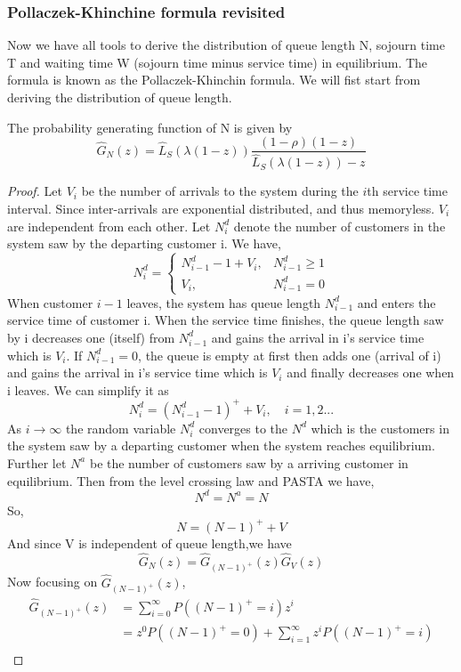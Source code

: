 \documentclass[project2.tex]{subfiles}
\begin{document}
\subsubsection{Pollaczek-Khinchine formula revisited}
Now we have all tools to derive the distribution of queue length N, sojourn time T and waiting time W (sojourn time minus service time) in equilibrium. The formula is known as the Pollaczek-Khinchin formula. We will fist start from deriving the distribution of queue length.
\begin{lemma}The probability generating function of N is given by 
$$\hat{G}_N(z)=\hat{L}_S(\lambda(1-z))\frac{(1-\rho)(1-z)}{\hat{L}_S(\lambda(1-z))-z}$$
\end{lemma}
\begin{proof}
Let $V_i$ be the number of arrivals to the system during the $i$th service time interval. Since inter-arrivals are exponential distributed, and thus memoryless. $V_i$ are independent from each other. Let $N_i^d$ denote the number of customers in the system saw by the departing customer i. We have,
\begin{equation*}
N_i^d=\left\{
\begin{array}{lcl}
N_{i-1}^d-1+V_i, &N_{i-1}^d\geq 1\\
V_i, &N_{i-1}^d=0
\end{array} 
\right.
\end{equation*}
When customer $i-1$ leaves, the system has queue length $N_{i-1}^d$ and enters the service time of customer i. When the service time finishes, the queue length saw by i decreases one (itself) from $N_{i-1}^d$ and gains the arrival in i's service time which is $V_i$. If $N_{i-1}^d=0$, the queue is empty at first then adds one (arrival of i) and gains the arrival in i's service time which is $V_i$ and finally decreases one when i leaves. We can simplify it as 
$$N_i^d=(N_{i-1}^d-1)^++V_i,\quad i=1,2...$$
As $i\rightarrow\infty$ the random variable $N_i^d$ converges to the $N^d$ which is the customers in the system saw by a departing customer when the system reaches equilibrium. Further let $N^a$ be the number of customers saw by a arriving customer in equilibrium. Then from the level crossing law and PASTA we have,
$$N^d=N^a=N$$ So,
$$N=(N-1)^++V$$ And since V is independent of queue length,we have
$$\hat{G}_N(z)=\hat{G}_{(N-1)^+}(z)\hat{G}_V(z)$$
Now focusing on $\hat{G}_{(N-1)^+}(z)$,
\begin{align*}
\hat{G}_{(N-1)^+}(z)&=\sum_{i=0}^\infty P((N-1)^+=i)z^i\\
&=z^0P((N-1)^+=0)+\sum_{i=1}^\infty z^iP((N-1)^+=i)\\

\end{align*}
\end{proof}
\end{document}
